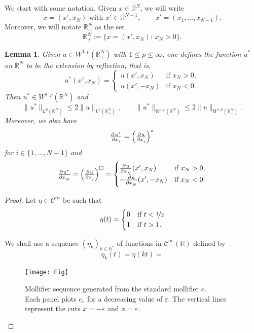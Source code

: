 \documentclass[a4paper,doc,11pt]{article}
\newtheorem{lemma}[theorem]{Lemma}
\newcommand{\R}{\mathbb{R}}
\newcommand{\N}{\mathbb{N}}
\newcommand{\CC}{\mathcal{C}}
\begin{document}
We start with some notation. Given \( x \in \R^N\), we will write
\[
    x = (x', x_N) \text{ with } x' \in \R^{N-1}, \qquad 
    x' = (x_1, \ldots, x_{N-1}).
\]
Moreover, we will notate \(\R^N_+\) as the set
\[
    \R^N_+ := \{ x = (x',x_N): \, x_N > 0 \}.
\]

\begin{lemma}
    Given \( u \in W^{1,p} (\R^N_+)\) with \( 1 \leq p \leq \infty\), one defines the function \(u^*\) on \(\R^N\) to be the \emph{extension by reflection}, that is,
    \[
        u^* (x',x_N) = 
        \begin{cases}
            u (x',x_N) & \text{if } x_N > 0,
            \\
            u (x',-x_N) & \text{if } x_N < 0.
        \end{cases}
    \]
    Then \( u^* \in W^{1,p} (\R^N)\) and
    \[
        \|u^*\|_{L^p (\R^N)} \leq 2 \|u\|_{L^p (\R^N_+)},
        \qquad
        \|u^*\|_{W^{1,p} (\R^N)} \leq 2 \|u\|_{W^{1,p} (\R^N_+)}.
    \]
    Moreover, we also have
    \[
        \pd{u^*}{x_i} = \left( \pd{u}{x_i} \right)^* 
    \]
    for \( i \in \{1,\ldots, N-1\}\) and
    \[
        \pd{u^*}{x_N} = \left( \pd{u}{x_i} \right)^{\square}
        =
        \begin{cases}
            \pd{u}{x_N} (x',x_N) & \text{if } x_N > 0,
            \\
            -\pd{u}{x_N} (x',-x_N) & \text{if } x_N < 0.
        \end{cases}
    \]
\end{lemma}
\begin{proof}
    Let \(\eta \in \CC^\infty\) be such that 
    \[
        \eta (t) =
        \begin{cases}
            0   &\text{if } t < \nicefrac 1 2
            \\
            1   & \text{if } t > 1. 
        \end{cases}
    \]

    We shall use a sequence \((\eta_k)_{k\in \N^*}\) of functions in \(\CC^\infty (\R)\) defined by
    \[
        \eta_k (t) = \eta (kt)
        =
    \]
    
    \begin{figure}
    \centering
    \texttt{[image: Fig]}
    \caption{Mollifier sequence generated from the standard mollifier \(e\).\\ Each panel plots \(e_\varepsilon\) for a decreasing value of \(\varepsilon\). The vertical lines represent the cuts \( x = -\varepsilon\) and \(x = \varepsilon\). }
    \label{fig:2-Ext}
\end{figure}
    
\end{proof}
\end{document}
